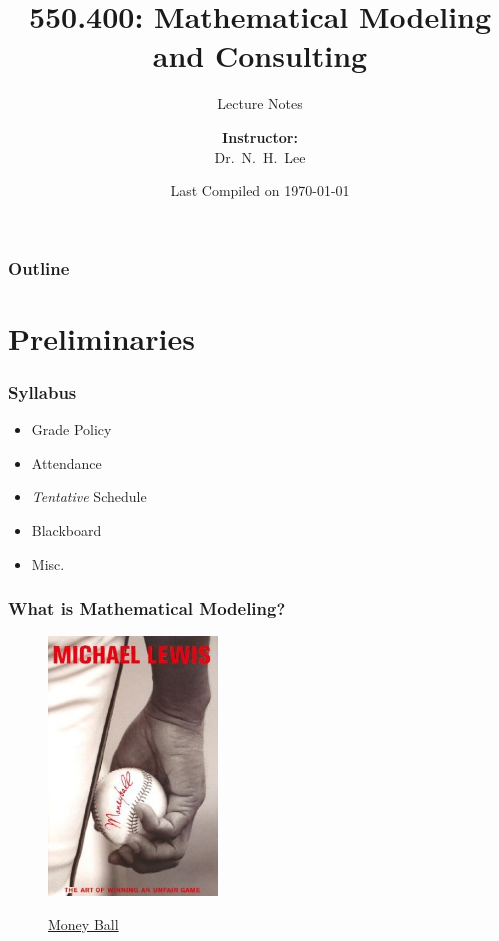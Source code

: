 \documentclass[hyperref={colorlinks=false},compress,handout,10pt]{beamer}
\title{{\color{blue} \LARGE 550.400: Mathematical Modeling and Consulting\newline} }
\subtitle{{\color{red} \large Lecture Notes} }
\author{ 
    {\bf{Instructor:}} \\ 
Dr.~N.~H.~Lee \\ 
    \vspace{5pt}
}
\institute{JHU AMS 2012 FALL}
\date{\mygreen Last Compiled on \today}
\let\olditem\item
\renewcommand{\item}{\setlength{\itemsep}{0.5\baselineskip}\olditem}
\begin{document}
\begin{frame}[plain]
  \titlepage
\end{frame}



\begin{frame}
  \frametitle{Outline}
  \tableofcontents
\end{frame}


\section{Preliminaries}

\begin{frame}
    \frametitle{Syllabus}
    \begin{itemize}
        \item Grade Policy
        \item Attendance
        \item \emph{Tentative} Schedule
        \item Blackboard
        \item Misc.
    \end{itemize}
\end{frame}


\begin{frame}
    \frametitle{What is Mathematical Modeling?}
    \begin{figure}
            \centering
            \caption{
            \href{http://www.youtube.com/watch?feature=endscreen&v=UuXwYZ3AQU0&NR=1}
            {Money Ball}}
            \href{http://www.youtube.com/watch?v=WNlCBy07z08}{
            \includegraphics[width=0.4\textwidth]{Moneyballs.jpg}
            }
            \label{fig:MondayBall} 
    \end{figure}
\end{frame}
\end{document}
